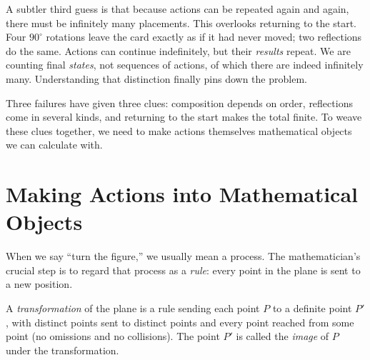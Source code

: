 A subtler third guess is that because actions can be repeated again and again, there must be infinitely many placements. This overlooks returning to the start. Four $90^\circ$ rotations leave the card exactly as if it had never moved; two reflections do the same. Actions can continue indefinitely, but their \emph{results} repeat. We are counting final \emph{states}, not sequences of actions, of which there are indeed infinitely many. Understanding that distinction finally pins down the problem.

\begin{figure}[htbp]
\begin{center}
\end{center}
\end{figure}

Three failures have given three clues: composition depends on order, reflections come in several kinds, and returning to the start makes the total finite. To weave these clues together, we need to make actions themselves mathematical objects we can calculate with.

\section{Making Actions into Mathematical Objects}

When we say ``turn the figure,'' we usually mean a process. The mathematician's crucial step is to regard that process as a \emph{rule}: every point in the plane is sent to a new position.

\begin{dingyi}[Transformation]
A \emph{transformation} of the plane is a rule sending each point $P$ to a definite point $P'$, with distinct points sent to distinct points and every point reached from some point (no omissions and no collisions). The point $P'$ is called the \emph{image} of $P$ under the transformation.
\end{dingyi}

